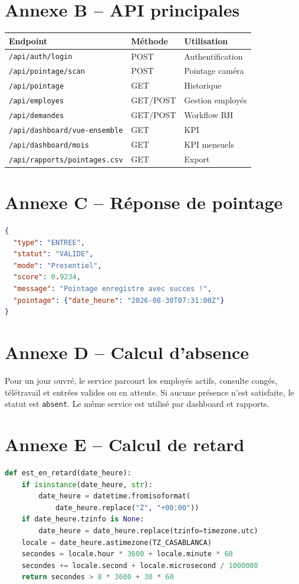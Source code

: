 \documentclass[11pt,a4paper,oneside]{report}
\begin{document}
\chapter{Annexe B -- API principales}
\begin{longtable}{p{5cm}p{3cm}p{5cm}}\toprule
Endpoint & Méthode & Utilisation\\\midrule
\texttt{/api/auth/login} & POST & Authentification\\
\texttt{/api/pointage/scan} & POST & Pointage caméra\\
\texttt{/api/pointage} & GET & Historique\\
\texttt{/api/employes} & GET/POST & Gestion employés\\
\texttt{/api/demandes} & GET/POST & Workflow RH\\
\texttt{/api/dashboard/vue-ensemble} & GET & KPI\\
\texttt{/api/dashboard/mois} & GET & KPI mensuels\\
\texttt{/api/rapports/pointages.csv} & GET & Export\\\bottomrule
\end{longtable}
\chapter{Annexe C -- Réponse de pointage}
\begin{lstlisting}[language=json,caption={Exemple JSON}]
{
  "type": "ENTREE",
  "statut": "VALIDE",
  "mode": "Presentiel",
  "score": 0.9234,
  "message": "Pointage enregistre avec succes !",
  "pointage": {"date_heure": "2026-08-30T07:31:00Z"}
}
\end{lstlisting}
\chapter{Annexe D -- Calcul d'absence}
Pour un jour ouvré, le service parcourt les employés actifs, consulte congés, télétravail et entrées valides ou en attente. Si aucune présence n'est satisfaite, le statut est \texttt{absent}. Le même service est utilisé par dashboard et rapports.
\chapter{Annexe E -- Calcul de retard}
\begin{lstlisting}[language=Python,caption={Comparaison stricte à 08:30}]
def est_en_retard(date_heure):
    if isinstance(date_heure, str):
        date_heure = datetime.fromisoformat(
            date_heure.replace("Z", "+00:00"))
    if date_heure.tzinfo is None:
        date_heure = date_heure.replace(tzinfo=timezone.utc)
    locale = date_heure.astimezone(TZ_CASABLANCA)
    secondes = locale.hour * 3600 + locale.minute * 60
    secondes += locale.second + locale.microsecond / 1000000
    return secondes > 8 * 3600 + 30 * 60
\end{lstlisting}
\end{document}
